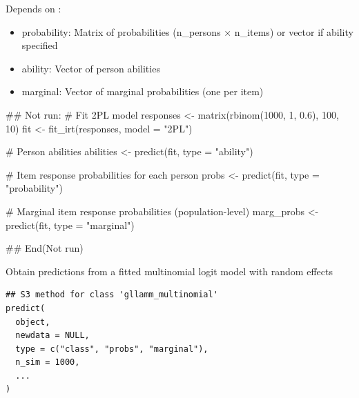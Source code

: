 \documentclass[a4paper]{book}
\begin{document}
%
\begin{Value}
Depends on :
\begin{itemize}

\item{} probability: Matrix of probabilities (n\_persons × n\_items) or vector if ability specified
\item{} ability: Vector of person abilities
\item{} marginal: Vector of marginal probabilities (one per item)

\end{itemize}

\end{Value}
%
\begin{Examples}
\begin{ExampleCode}
## Not run: 
# Fit 2PL model
responses <- matrix(rbinom(1000, 1, 0.6), 100, 10)
fit <- fit_irt(responses, model = "2PL")

# Person abilities
abilities <- predict(fit, type = "ability")

# Item response probabilities for each person
probs <- predict(fit, type = "probability")

# Marginal item response probabilities (population-level)
marg_probs <- predict(fit, type = "marginal")

## End(Not run)

\end{ExampleCode}
\end{Examples}
%
\begin{Description}
Obtain predictions from a fitted multinomial logit model with random effects
\end{Description}
%
\begin{Usage}
\begin{verbatim}
## S3 method for class 'gllamm_multinomial'
predict(
  object,
  newdata = NULL,
  type = c("class", "probs", "marginal"),
  n_sim = 1000,
  ...
)
\end{verbatim}
\end{Usage}
%
\end{document}

